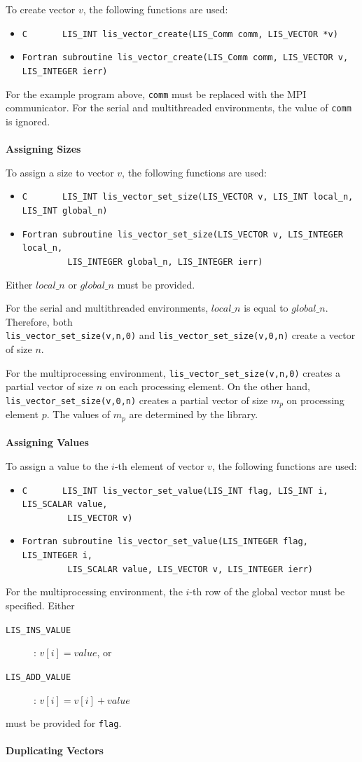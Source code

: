 \documentclass[a4paper]{article}
\begin{document}
To create vector $v$, the following functions are used: 
\begin{itemize}
\item \verb|C       LIS_INT lis_vector_create(LIS_Comm comm, LIS_VECTOR *v)|
\item \verb|Fortran subroutine lis_vector_create(LIS_Comm comm, LIS_VECTOR v, LIS_INTEGER ierr)|
\end{itemize}
For the example program above, {\tt comm} must be replaced with the MPI communicator. 
For the serial and multithreaded environments, the value of {\tt comm} is ignored.
\\ \\
\noindent
{\bf Assigning Sizes}

To assign a size to vector $v$, the following functions are used: 
\begin{itemize}
\item \verb|C       LIS_INT lis_vector_set_size(LIS_VECTOR v, LIS_INT local_n, LIS_INT global_n)|
\item \verb|Fortran subroutine lis_vector_set_size(LIS_VECTOR v, LIS_INTEGER local_n,|\\
      \verb|         LIS_INTEGER global_n, LIS_INTEGER ierr)| 
\end{itemize}
Either $local\_n$ or $global\_n$ must be provided.

For the serial and multithreaded environments, $local\_n$ 
is equal to $global\_n$. 
Therefore, both \\
\verb|lis_vector_set_size(v,n,0)| and \verb|lis_vector_set_size(v,0,n)| create a vector of size $n$. 

For the multiprocessing environment, \verb|lis_vector_set_size(v,n,0)| 
creates a partial vector of size $n$ on each processing element. On the other hand, 
\verb|lis_vector_set_size(v,0,n)| creates a partial vector of size 
$m_p$ on processing element $p$. The values of $m_p$ are determined by the library. 
\\ \\
\noindent
{\bf Assigning Values}

To assign a value to the $i$-th element of vector $v$, the following functions are used:
\begin{itemize}
\item \verb|C       LIS_INT lis_vector_set_value(LIS_INT flag, LIS_INT i, LIS_SCALAR value,|\\
      \verb|         LIS_VECTOR v)|
\item \verb|Fortran subroutine lis_vector_set_value(LIS_INTEGER flag, LIS_INTEGER i,|\\
      \verb|         LIS_SCALAR value, LIS_VECTOR v, LIS_INTEGER ierr)|
\end{itemize}
For the multiprocessing environment, the $i$-th row of the global vector must be
specified. 
Either
\begin{description}
\item[\tt LIS\_INS\_VALUE]: $v[i] = value$, or
\item[\tt LIS\_ADD\_VALUE]: $v[i] = v[i] + value$
\end{description}
must be provided for \verb+flag+.
\\ \\
\noindent
{\bf Duplicating Vectors}
\end{document}
